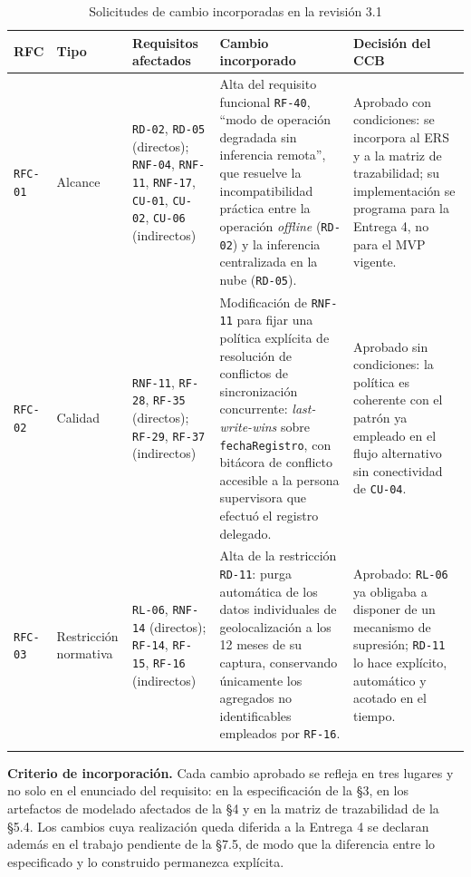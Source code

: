 \documentclass[11pt,a4paper]{article}
\newcommand{\id}[1]{\texttt{\begingroup\hyphenpenalty=10000\relax#1\endgroup}}
\renewcommand{\id}[1]{\texttt{#1}}
\begin{document}
{\setlength{\tabcolsep}{4pt}
\begin{longtable}{|C{1.4cm}|L{2.0cm}|L{3.4cm}|L{5.2cm}|L{2.6cm}|}
\hline
{}\textbf{RFC} & \textbf{Tipo} & \textbf{Requisitos afectados} & \textbf{Cambio incorporado} & \textbf{Decisión del CCB} \\
\hline
\endhead
\id{RFC-01} & Alcance & \id{RD-02}, \id{RD-05} (directos); \id{RNF-04}, \id{RNF-11}, \id{RNF-17}, \id{CU-01}, \id{CU-02}, \id{CU-06} (indirectos) & Alta del requisito funcional \id{RF-40}, ``modo de operación degradada sin inferencia remota'', que resuelve la incompatibilidad práctica entre la operación \emph{offline} (\id{RD-02}) y la inferencia centralizada en la nube (\id{RD-05}). & Aprobado con condiciones: se incorpora al ERS y a la matriz de trazabilidad; su implementación se programa para la Entrega 4, no para el MVP vigente. \\ \hline
\id{RFC-02} & Calidad & \id{RNF-11}, \id{RF-28}, \id{RF-35} (directos); \id{RF-29}, \id{RF-37} (indirectos) & Modificación de \id{RNF-11} para fijar una política explícita de resolución de conflictos de sincronización concurrente: \emph{last-write-wins} sobre \id{fechaRegistro}, con bitácora de conflicto accesible a la persona supervisora que efectuó el registro delegado. & Aprobado sin condiciones: la política es coherente con el patrón ya empleado en el flujo alternativo sin conectividad de \id{CU-04}. \\ \hline
\id{RFC-03} & Restricción normativa & \id{RL-06}, \id{RNF-14} (directos); \id{RF-14}, \id{RF-15}, \id{RF-16} (indirectos) & Alta de la restricción \id{RD-11}: purga automática de los datos individuales de geolocalización a los 12 meses de su captura, conservando únicamente los agregados no identificables empleados por \id{RF-16}. & Aprobado: \id{RL-06} ya obligaba a disponer de un mecanismo de supresión; \id{RD-11} lo hace explícito, automático y acotado en el tiempo. \\ \hline
\caption{Solicitudes de cambio incorporadas en la revisión 3.1}
\end{longtable}}

\noindent\textbf{Criterio de incorporación.} Cada cambio aprobado se refleja en tres lugares y no
solo en el enunciado del requisito: en la especificación de la §3, en los artefactos de modelado
afectados de la §4 y en la matriz de trazabilidad de la §5.4. Los cambios cuya realización queda
diferida a la Entrega 4 se declaran además en el trabajo pendiente de la §7.5, de modo que la
diferencia entre lo especificado y lo construido permanezca explícita.
\end{document}
